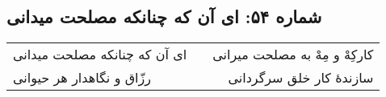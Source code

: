 \begin{center}
\section*{شماره ۵۴: ای آن که چنانکه مصلحت میدانی}
\label{sec:054}
\begin{longtable}{l p{0.5cm} r}
ای آن که چنانکه مصلحت میدانی
&&
کارکِهْ و مِهْ به مصلحت میرانی
\\
رزّاق و نگاهدار هر حیوانی
&&
سازندهٔ کار خلق سرگردانی
\\
\end{longtable}
\end{center}
